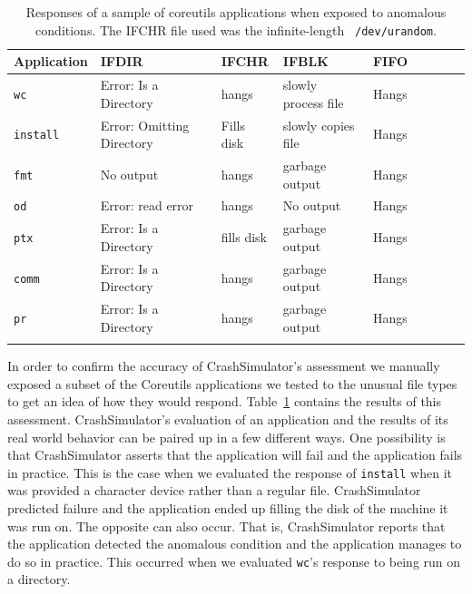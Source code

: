 \begin{table}[t]
    \scriptsize{}
    \begin{tabular}{l  l  l  l  l  l  l  l  l}
    \toprule{}
        Application         & IFDIR                     & IFCHR       & IFBLK                & FIFO \\
\hline
        {\tt wc}            & Error: Is a Directory     & hangs       & slowly process file  & Hangs\\
        {\tt install}       & Error: Omitting Directory & Fills disk  & slowly copies file   & Hangs\\
        {\tt fmt}           & No output                 & hangs       & garbage output       & Hangs\\
        {\tt od}            & Error: read error         & hangs       & No output            & Hangs\\
        {\tt ptx}           & Error: Is a Directory     & fills disk  & garbage output       & Hangs\\
        {\tt comm}          & Error: Is a Directory     & hangs       & garbage output       & Hangs\\
        {\tt pr}            & Error: Is a Directory     & hangs       & garbage output       & Hangs\\
\hline
    \bottomrule{}
    \end{tabular}
    \caption{Responses of a sample of coreutils applications when exposed to
      anomalous conditions.  The IFCHR file used was the infinite-length {\tt
        /dev/urandom}.}
    \label{table:applicationresponses}
\end{table}


In order to confirm the accuracy of CrashSimulator's assessment we manually
exposed a subset of the Coreutils applications we tested to the unusual file
types to get an idea of how they would respond.
Table~\ref{table:applicationresponses} contains the results of this assessment.
CrashSimulator's evaluation of an application and the results of its real world
behavior can be paired up in a few different ways.
One possibility is that CrashSimulator
asserts that the application will fail and the application fails in practice.
This is the case when we evaluated the response of  {\tt install} when it was
provided a character device rather than a regular file. CrashSimulator
predicted failure and the application ended up filling the disk of the machine
it was run on.  The opposite can also occur.  That is, CrashSimulator reports
that the application detected the anomalous condition and the application manages
to do so in practice.  This occurred when we evaluated {\tt wc}'s response to being
run on a directory.

